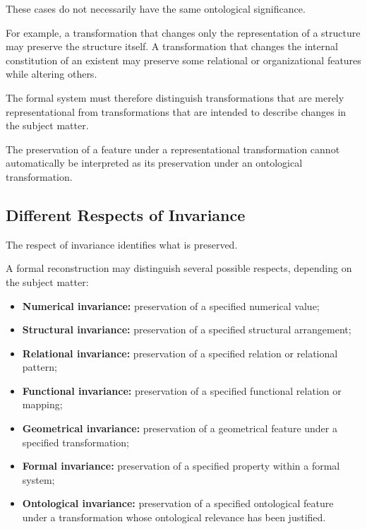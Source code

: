 These cases do not necessarily have the same
ontological significance.

For example, a transformation that changes only
the representation of a structure may preserve
the structure itself. A transformation that changes
the internal constitution of an existent may
preserve some relational or organizational features
while altering others.

The formal system must therefore distinguish
transformations that are merely representational
from transformations that are intended to describe
changes in the subject matter.

The preservation of a feature under a
representational transformation cannot automatically
be interpreted as its preservation under an
ontological transformation.

\subsection{Different Respects of Invariance}

The respect of invariance identifies what is
preserved.

A formal reconstruction may distinguish several
possible respects, depending on the subject matter:

\begin{itemize}
    \item \textbf{Numerical invariance:} preservation
    of a specified numerical value;

    \item \textbf{Structural invariance:} preservation
    of a specified structural arrangement;

    \item \textbf{Relational invariance:} preservation
    of a specified relation or relational pattern;

    \item \textbf{Functional invariance:} preservation
    of a specified functional relation or mapping;

    \item \textbf{Geometrical invariance:} preservation
    of a geometrical feature under a specified
    transformation;

    \item \textbf{Formal invariance:} preservation
    of a specified property within a formal system;

    \item \textbf{Ontological invariance:} preservation
    of a specified ontological feature under a
    transformation whose ontological relevance
    has been justified.
\end{itemize}

